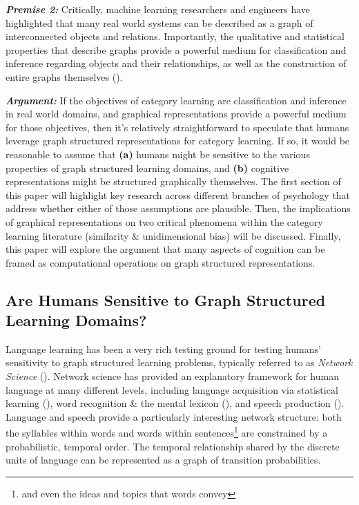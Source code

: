 \documentclass[12pt]{article}
\let\oldcite=\cite
\renewcommand{\cite}[1]{\textcolor[rgb]{0, .121, .388}{\oldcite{#1}}}
\begin{document}
\emph{\textbf{Premise 2:}} Critically, machine learning researchers and engineers have highlighted that many real world systems can be described as a graph of interconnected objects and relations. Importantly, the qualitative and statistical properties that describe graphs provide a powerful medium for classification and inference regarding objects and their relationships, as well as the construction of entire graphs themselves (\cite{schlichtkrull2018modeling,bronstein2017geometric}). 

\emph{\textbf{Argument:}} If the objectives of category learning are classification and inference in real world domains, and graphical representations provide a powerful medium for those objectives, then it's relatively straightforward to speculate that humans leverage graph structured representations for category learning. If so, it would be reasonable to assume that \textbf{(a)} humans might be sensitive to the various  properties of graph structured learning domains, and \textbf{(b)} cognitive representations might be structured graphically themselves. The first section of this paper will highlight key research across different branches of psychology that address whether either of those assumptions are plausible. Then, the implications of graphical representations on two critical phenomena within the category learning literature (similarity \& unidimensional bias) will be discussed. Finally, this paper will explore the argument that many aspects of cognition can be framed as computational operations on graph structured representations. 


\subsection{Are Humans Sensitive to Graph Structured Learning Domains?}

Language learning has been a very rich testing ground for testing humans' sensitivity to graph structured learning problems, typically referred to as \emph{Network Science} (\cite{lynn2019graph}). Network science has provided an explanatory framework for human language at many different levels, including language acquisition via statistical learning (\cite{saffran1996statistical,lynn2019graph}), word recognition \& the mental lexicon (\cite{vitevitch2008can,chan2009influence}), and speech production (\cite{chan2010network}). Language and speech provide a particularly interesting network structure: both the syllables within words and words within sentences\footnote{and even the ideas and topics that words convey} are constrained by a probabilistic, temporal order. The temporal relationship shared by the discrete units of language can be represented as a graph of transition probabilities.
\end{document}
